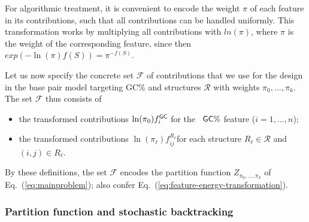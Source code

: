 \documentclass[twocolumn]{bmcart}%
\newtheorem{definition}[theorem]{Definition}
\newcommand{\network}{\mathcal{N}}
\newcommand{\partfun}[1]{Z_{#1}}
\newcommand{\real}{\mathbb{R}}
\newcommand{\F}{\mathcal{F}}
\newcommand{\R}{\mathcal{R}}
\newcommand{\X}{\mathcal{X}}
\newcommand{\Def}[1]{\emph{#1}}
\newcommand{\Nuc}[1]{{\sf #1}}
\newcommand{\Cb}{\Nuc{C}}
\newcommand{\Gb}{\Nuc{G}}
\newcommand{\GCb}{\Gb\Cb}
\begin{document}
%


For algorithmic treatment, it is convenient to encode the weight $\pi$ of each feature in its contributions, such that all contributions can be handled uniformly. This transformation works by multiplying all contributions with $ln(\pi)$, where $\pi$ is the weight of the corresponding feature, since then
$exp(-\ln(\pi)f(S))=\pi^{-f(S)}.$

%
Let us now specify the concrete set $\F$ of contributions that we use
for the design in the base pair model targeting \GCb\% and structures $\R$ with weights $\pi_0,\dots,\pi_k$. The set $\F$ thus consists of
\begin{itemize}
\item the transformed contributions $\ln(\pi_0)f^{\GCb}_i$ for the ~$\GCb\%$ feature ($i=1,\dots,n$);
\item the transformed contributions $\ln(\pi_\ell)f^{R_\ell}_{ij}$for each structure $R_\ell\in\R$ and $(i,j)\in R_\ell.$
\end{itemize}

By these definitions, the set $\F$ encodes the partition function $\partfun{\pi_0,\dots,\pi_k}$ of Eq.~(\ref{eq:mainproblem}); also confer Eq.~(\ref{eq:feature-energy-transformation}). 

\subsubsection*{Partition function and stochastic backtracking}\label{sec:PF}
\end{document}
